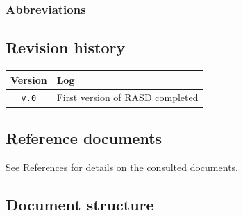\documentclass[12pt]{article}
\begin{document}
      \begin{description}
        \item[] %
      \end{description}

    \subsubsection{Abbreviations}

      \begin{description}
        \item[] %
      \end{description}

  \subsection{Revision history}

  \label{sec:revhistory}
    \begin{table}[!h]
      \begin{tabular}{|c|l|}
        \hline
        \textbf{Version}                & \textbf{Log} \\ \hline
        \texttt{v.0} &
          First version of RASD completed
        \\ \hline
      \end{tabular}
    \end{table}

  \subsection{Reference documents}

    See References for details on the consulted documents.

  \subsection{Document structure}
\end{document}

